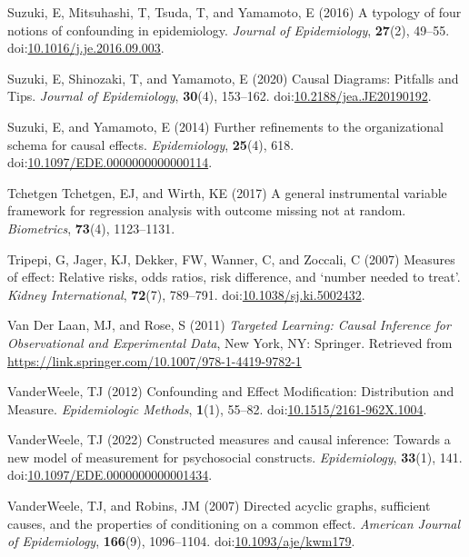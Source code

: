 \documentclass[
  single column]{article}
\newlength{\cslhangindent}
\newenvironment{CSLReferences}[2] %
 {\begin{list}{}{%
  \setlength{\itemindent}{0pt}
  \setlength{\leftmargin}{0pt}
  \setlength{\parsep}{0pt}
  \ifodd #1
   \setlength{\leftmargin}{\cslhangindent}
   \setlength{\itemindent}{-1\cslhangindent}
  \fi
  \setlength{\itemsep}{#2\baselineskip}}}
 {\end{list}}
\begin{document}
\begin{CSLReferences}{1}{0}
Suzuki, E, Mitsuhashi, T, Tsuda, T, and Yamamoto, E (2016) A typology of
four notions of confounding in epidemiology. \emph{Journal of
Epidemiology}, \textbf{27}(2), 49--55.
doi:\href{https://doi.org/10.1016/j.je.2016.09.003}{10.1016/j.je.2016.09.003}.

Suzuki, E, Shinozaki, T, and Yamamoto, E (2020) Causal Diagrams:
Pitfalls and Tips. \emph{Journal of Epidemiology}, \textbf{30}(4),
153--162.
doi:\href{https://doi.org/10.2188/jea.JE20190192}{10.2188/jea.JE20190192}.

Suzuki, E, and Yamamoto, E (2014) Further refinements to the
organizational schema for causal effects. \emph{Epidemiology},
\textbf{25}(4), 618.
doi:\href{https://doi.org/10.1097/EDE.0000000000000114}{10.1097/EDE.0000000000000114}.

Tchetgen Tchetgen, EJ, and Wirth, KE (2017) A general instrumental
variable framework for regression analysis with outcome missing not at
random. \emph{Biometrics}, \textbf{73}(4), 1123--1131.

Tripepi, G, Jager, KJ, Dekker, FW, Wanner, C, and Zoccali, C (2007)
Measures of effect: Relative risks, odds ratios, risk difference, and
{`}number needed to treat{'}. \emph{Kidney International},
\textbf{72}(7), 789--791.
doi:\href{https://doi.org/10.1038/sj.ki.5002432}{10.1038/sj.ki.5002432}.

Van Der Laan, MJ, and Rose, S (2011) \emph{Targeted Learning: Causal
Inference for Observational and Experimental Data}, New York, NY:
Springer. Retrieved from
\url{https://link.springer.com/10.1007/978-1-4419-9782-1}

VanderWeele, TJ (2012) Confounding and Effect Modification: Distribution
and Measure. \emph{Epidemiologic Methods}, \textbf{1}(1), 55--82.
doi:\href{https://doi.org/10.1515/2161-962X.1004}{10.1515/2161-962X.1004}.

VanderWeele, TJ (2022) Constructed measures and causal inference:
Towards a new model of measurement for psychosocial constructs.
\emph{Epidemiology}, \textbf{33}(1), 141.
doi:\href{https://doi.org/10.1097/EDE.0000000000001434}{10.1097/EDE.0000000000001434}.

VanderWeele, TJ, and Robins, JM (2007) Directed acyclic graphs,
sufficient causes, and the properties of conditioning on a common
effect. \emph{American Journal of Epidemiology}, \textbf{166}(9),
1096--1104.
doi:\href{https://doi.org/10.1093/aje/kwm179}{10.1093/aje/kwm179}.


\end{CSLReferences}
\end{document}
